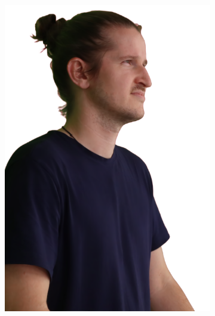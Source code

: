 \begin{figure}[!ht]
\begin{subfigure}{0.12\linewidth}
        \includegraphics[width=\textwidth]{Figures/results/initials/ephra/20_render.png}

\end{subfigure}
\end{figure}
